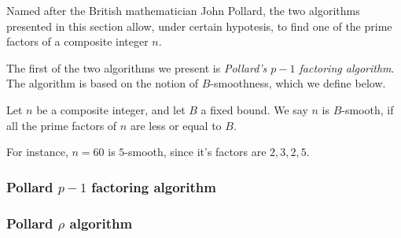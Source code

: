 \documentclass{subfiles}
\begin{document}
    Named after the British mathematician John Pollard,
        the two algorithms presented in this section allow,
        under certain hypotesis, to find one of the prime factors of a composite integer \(n\).
        
    The first of the two algorithms we present is \emph{Pollard's \(p - 1\) factoring algorithm}.
        The algorithm is based on the notion of \(B\)-smoothness,
        which we define below.

    \begin{definition*}[B-smoothness]
        Let \(n\) be a composite integer, and let \(B\) a fixed bound.
            We say \(n\) is \(B\)-smooth, if all the prime factors of \(n\) are less or equal to \(B\).
    \end{definition*}
    For instance, \(n = 60\) is \(5\)-smooth, since it's factors are \(2, 3, 2, 5\).

    \subsubsection{Pollard \(p - 1\) factoring algorithm}
    

    \subsubsection{Pollard \(\rho\) algorithm}
    
\end{document}
